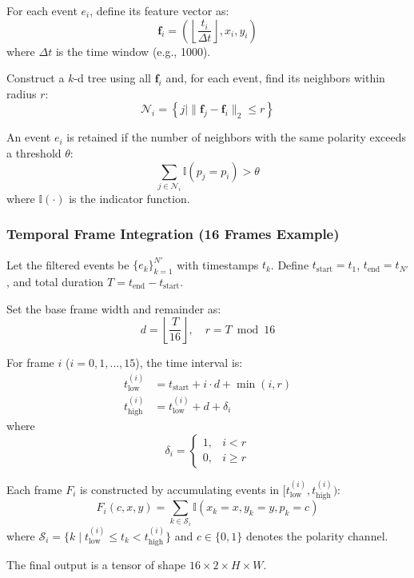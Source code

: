 \documentclass[conference]{IEEEtran}
\begin{document}
For each event $e_i$, define its feature vector as:
\[
\mathbf{f}_i = \left( \left\lfloor \frac{t_i}{\Delta t} \right\rfloor, x_i, y_i \right)
\]
where $\Delta t$ is the time window (e.g., 1000).

Construct a $k$-d tree using all $\mathbf{f}_i$ and, for each event, find its neighbors within radius $r$:
\[
\mathcal{N}_i = \left\{ j \mid \|\mathbf{f}_j - \mathbf{f}_i\|_2 \leq r \right\}
\]

An event $e_i$ is retained if the number of neighbors with the same polarity exceeds a threshold $\theta$:
\[
\sum_{j \in \mathcal{N}_i} \mathbb{I}(p_j = p_i) > \theta
\]
where $\mathbb{I}(\cdot)$ is the indicator function.

\subsubsection{Temporal Frame Integration (16 Frames Example)}

Let the filtered events be $\{e_k\}_{k=1}^{N'}$ with timestamps $t_k$. Define $t_{\text{start}} = t_1$, $t_{\text{end}} = t_{N'}$, and total duration $T = t_{\text{end}} - t_{\text{start}}$.

Set the base frame width and remainder as:
\[
d = \left\lfloor \frac{T}{16} \right\rfloor, \quad r = T \bmod 16
\]

For frame $i$ ($i = 0, 1, \ldots, 15$), the time interval is:
\begin{align}
t_{\text{low}}^{(i)} &= t_{\text{start}} + i \cdot d + \min(i, r) \\
t_{\text{high}}^{(i)} &= t_{\text{low}}^{(i)} + d + \delta_i
\end{align}
where
\begin{equation}
\delta_i =
\begin{cases}
1, & i < r \\
0, & i \geq r
\end{cases}
\end{equation}

Each frame $F_i$ is constructed by accumulating events in $[t_{\text{low}}^{(i)}, t_{\text{high}}^{(i)})$:
\[
F_i(c, x, y) = \sum_{k \in \mathcal{S}_i} \mathbb{I}(x_k = x, y_k = y, p_k = c)
\]
where $\mathcal{S}_i = \{k \mid t_{\text{low}}^{(i)} \leq t_k < t_{\text{high}}^{(i)}\}$ and $c \in \{0, 1\}$ denotes the polarity channel.

The final output is a tensor of shape $16 \times 2 \times H \times W$.
\end{document}
